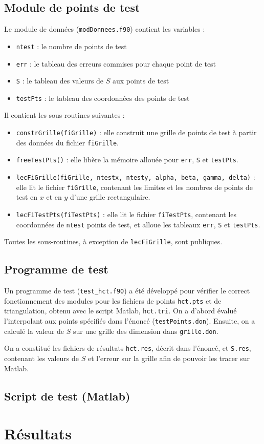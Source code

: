 \documentclass[12 pt]{article}
\begin{document}
\subsection{Module de points de test}
Le module de données (\texttt{modDonnees.f90}) contient les variables :
\begin{itemize}
	\item \texttt{ntest} : le nombre de points de test
	\item \texttt{err} : le tableau des erreurs commises pour chaque point de test
	\item \texttt{S} : le tableau des valeurs de $S$ aux points de test
	\item \texttt{testPts} : le tableau des coordonnées des points de test
\end{itemize}
Il contient les sous-routines suivantes :
\begin{itemize} 
	\item \texttt{constrGrille(fiGrille)} : elle construit une grille de points de test à partir des données du fichier \texttt{fiGrille}.
	\item \texttt{freeTestPts()} : elle libère la mémoire allouée pour \texttt{err}, \texttt{S} et \texttt{testPts}.
	\item \texttt{lecFiGrille(fiGrille, ntestx, ntesty, alpha, beta, gamma, delta)} : elle lit le fichier \texttt{fiGrille}, contenant les limites et les nombres de points de test en $x$ et en $y$ d'une grille rectangulaire.
	\item \texttt{lecFiTestPts(fiTestPts)} : elle lit le fichier \texttt{fiTestPts}, contenant les coordonnées de \texttt{ntest} points de test, et alloue les tableaux \texttt{err}, \texttt{S} et \texttt{testPts}.
\end{itemize}
Toutes les sous-routines, à exception de \texttt{lecFiGrille}, sont publiques.
\subsection{Programme de test}
Un programme de test (\texttt{test\_hct.f90}) a été développé pour vérifier le correct fonctionnement des modules pour les fichiers de points \texttt{hct.pts} et de triangulation, obtenu avec le script Matlab, \texttt{hct.tri}. On a d'abord évalué l'interpolant aux points spécifiés dans l'énoncé (\texttt{testPoints.don}). Ensuite, on a calculé la valeur de $S$ sur une grille des dimension dans \texttt{grille.don}.

On a constitué les fichiers de résultats \texttt{hct.res}, décrit dans l'énoncé, et \texttt{S.res}, contenant les valeurs de $S$ et l'erreur sur la grille afin de pouvoir les tracer sur Matlab.
\subsection{Script de test (Matlab)}
\section{Résultats}
\end{document}
